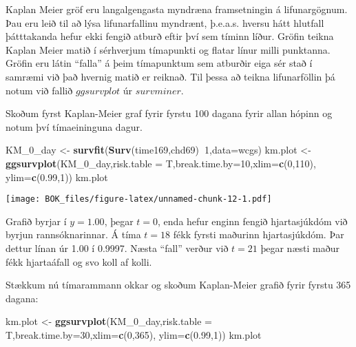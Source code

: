 \documentclass[
]{book}
\newenvironment{Shaded}{\begin{snugshade}}{\end{snugshade}}
\newcommand{\DataTypeTok}[1]{\textcolor[rgb]{0.13,0.29,0.53}{#1}}
\newcommand{\DecValTok}[1]{\textcolor[rgb]{0.00,0.00,0.81}{#1}}
\newcommand{\FloatTok}[1]{\textcolor[rgb]{0.00,0.00,0.81}{#1}}
\newcommand{\KeywordTok}[1]{\textcolor[rgb]{0.13,0.29,0.53}{\textbf{#1}}}
\newcommand{\NormalTok}[1]{#1}
\newcommand{\OperatorTok}[1]{\textcolor[rgb]{0.81,0.36,0.00}{\textbf{#1}}}
\newcommand{\StringTok}[1]{\textcolor[rgb]{0.31,0.60,0.02}{#1}}
\begin{document}
Kaplan Meier gröf eru langalgengasta myndræna framsetningin á lifunargögnum. Þau eru leið til að lýsa lifunarfallinu myndrænt, þ.e.a.s. hversu hátt hlutfall þátttakanda hefur ekki fengið atburð eftir því sem tíminn líður. Gröfin teikna Kaplan Meier matið í sérhverjum tímapunkti og flatar línur milli punktanna. Gröfin eru látin ``falla'' á þeim tímapunktum sem atburðir eiga sér stað í samræmi við það hvernig matið er reiknað. Til þessa að teikna lifunarföllin þá notum við fallið \(ggsurvplot\) úr \(survminer\).

Skoðum fyrst Kaplan-Meier graf fyrir fyrstu 100 dagana fyrir allan hópinn og notum því tímaeininguna dagur.

\begin{Shaded}
\begin{Highlighting}[]
\NormalTok{KM_}\DecValTok{0}\NormalTok{_day <-}\StringTok{ }\KeywordTok{survfit}\NormalTok{(}\KeywordTok{Surv}\NormalTok{(time169,chd69)}\OperatorTok{~}\DecValTok{1}\NormalTok{,}\DataTypeTok{data=}\NormalTok{wcgs)}
\NormalTok{km.plot <-}\StringTok{ }\KeywordTok{ggsurvplot}\NormalTok{(KM_}\DecValTok{0}\NormalTok{_day,}\DataTypeTok{risk.table =}\NormalTok{ T,}\DataTypeTok{break.time.by=}\DecValTok{10}\NormalTok{,}\DataTypeTok{xlim=}\KeywordTok{c}\NormalTok{(}\DecValTok{0}\NormalTok{,}\DecValTok{110}\NormalTok{),}
                      \DataTypeTok{ylim=}\KeywordTok{c}\NormalTok{(}\FloatTok{0.99}\NormalTok{,}\DecValTok{1}\NormalTok{)) }
\NormalTok{km.plot }
\end{Highlighting}
\end{Shaded}

\texttt{[image: BOK\_files/figure-latex/unnamed-chunk-12-1.pdf]}

Grafið byrjar í \(y=1.00\), þegar \(t=0\), enda hefur enginn fengið hjartasjúkdóm við byrjun rannsóknarinnar. Á tíma \(t=18\) fékk fyrsti maðurinn hjartasjúkdóm. Þar dettur línan úr 1.00 í 0.9997. Næsta ``fall'' verður við \(t=21\) þegar næsti maður fékk hjartaáfall og svo koll af kolli.

Stækkum nú tímarammann okkar og skoðum Kaplan-Meier grafið fyrir fyrstu 365 dagana:

\begin{Shaded}
\begin{Highlighting}[]
\NormalTok{km.plot <-}\StringTok{ }\KeywordTok{ggsurvplot}\NormalTok{(KM_}\DecValTok{0}\NormalTok{_day,}\DataTypeTok{risk.table =}\NormalTok{ T,}\DataTypeTok{break.time.by=}\DecValTok{30}\NormalTok{,}\DataTypeTok{xlim=}\KeywordTok{c}\NormalTok{(}\DecValTok{0}\NormalTok{,}\DecValTok{365}\NormalTok{),}
                      \DataTypeTok{ylim=}\KeywordTok{c}\NormalTok{(}\FloatTok{0.99}\NormalTok{,}\DecValTok{1}\NormalTok{)) }
\NormalTok{km.plot }
\end{Highlighting}
\end{Shaded}
\end{document}
